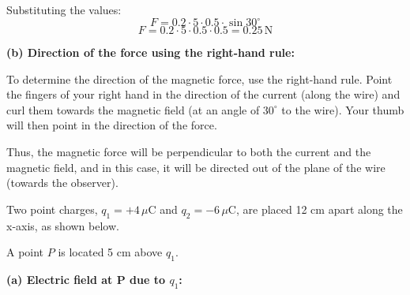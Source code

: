 \documentclass[addpoints]{exam}
\begin{document}
\begin{questions}
\begin{solution}[11.5cm]
Substituting the values:
\[
F = 0.2 \cdot 5 \cdot 0.5 \cdot \sin 30^\circ
\]
\[
F = 0.2 \cdot 5 \cdot 0.5 \cdot 0.5 = 0.25 \, \text{N}
\]

\textbf{(b) Direction of the force using the right-hand rule:}  

To determine the direction of the magnetic force, use the right-hand rule. Point the fingers of your right hand in the direction of the current (along the wire) and curl them towards the magnetic field (at an angle of \(30^\circ\) to the wire). Your thumb will then point in the direction of the force.

Thus, the magnetic force will be perpendicular to both the current and the magnetic field, and in this case, it will be directed out of the plane of the wire (towards the observer).

\end{solution}



\question Two point charges, \( q_1 = +4 \, \mu\text{C} \) and \( q_2 = -6 \, \mu\text{C} \), are placed 12 cm apart along the x-axis, as shown below.  
\begin{center}
\end{center}  
A point \( P \) is located 5 cm above \( q_1 \).  
\begin{solution}[16cm]
\textbf{(a) Electric field at P due to \(q_1\):}  


\end{solution}
\end{questions}
\end{document}
